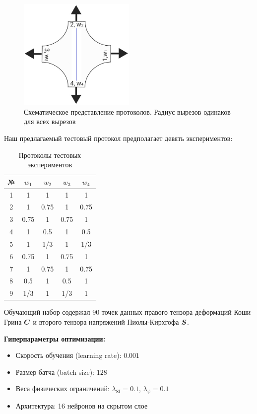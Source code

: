  \begin{figure}[H]
  \centering
  \includegraphics[width=0.5\textwidth]{img/malt_dirichlet.png}
  \caption{Схематическое представление протоколов. 
  Радиус вырезов одинаков для всех вырезов}
  \label{fig:malt_displacements}
\end{figure}
 
Наш предлагаемый тестовый протокол предполагает девять экспериментов:

\begin{table}[H]
\centering
\caption{Протоколы тестовых экспериментов}
\label{tab:test_protocols}
\begin{tabular}{|c|c|c|c|c|}
\hline
\textbf{№} & $w_1$ & $w_2$ & $w_3$ & $w_4$ \\
\hline
1 & 1 & 1 & 1 & 1 \\
2 & 1 & 0.75 & 1 & 0.75 \\
3 & 0.75 & 1 & 0.75 & 1 \\
4 & 1 & 0.5 & 1 & 0.5 \\
5 & 1 & 1/3 & 1 & 1/3 \\
6 & 0.75 & 1 & 0.75 & 1 \\
7 & 1 & 0.75 & 1 & 0.75 \\
8 & 0.5 & 1 & 0.5 & 1 \\
9 & 1/3 & 1 & 1/3 & 1 \\
\hline
\end{tabular}
\end{table}

Обучающий набор содержал 90 точек данных правого тензора деформаций Коши-Грина $\boldsymbol{C}$ 
и второго тензора напряжений Пиолы-Кирхгофа $\boldsymbol{S}$.

\textbf{Гиперпараметры оптимизации:}
\begin{itemize}
  \item Скорость обучения (learning rate): $0.001$
  \item Размер батча (batch size): $128$
  \item Веса физических ограничений: $\lambda_{\text{SI}} = 0.1$, $\lambda_{\psi} = 0.1$
  \item Архитектура: 16 нейронов на скрытом слое
\end{itemize}

